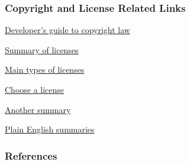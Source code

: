 \documentclass[t,12pt,numbers,fleqn]{beamer}
\begin{document}
\begin{frame}
\frametitle{Copyright and License Related Links}

\bi
\item
  \href{http://haacked.com/archive/2006/01/24/TheDevelopersGuideToCopyrightLaw-Part1.aspx/}{Developer's
    guide to copyright law}

\item \href{https://www.smashingmagazine.com/2010/03/a-short-guide-to-open-source-and-similar-licenses/}{Summary of licenses}

\item
  \href{http://haacked.com/archive/2007/04/04/there-are-only-four-software-licenses.aspx/}{Main
    types of licenses}

\item \href{http://choosealicense.com}{Choose a license}
\item \href{http://choosealicense.com/licenses/}{Another summary}
\item \href{https://tldrlegal.com}{Plain English summaries}

\ei

\end{frame}


\begin{frame}[allowframebreaks]
\frametitle{References}



\end{frame}

\end{document}
